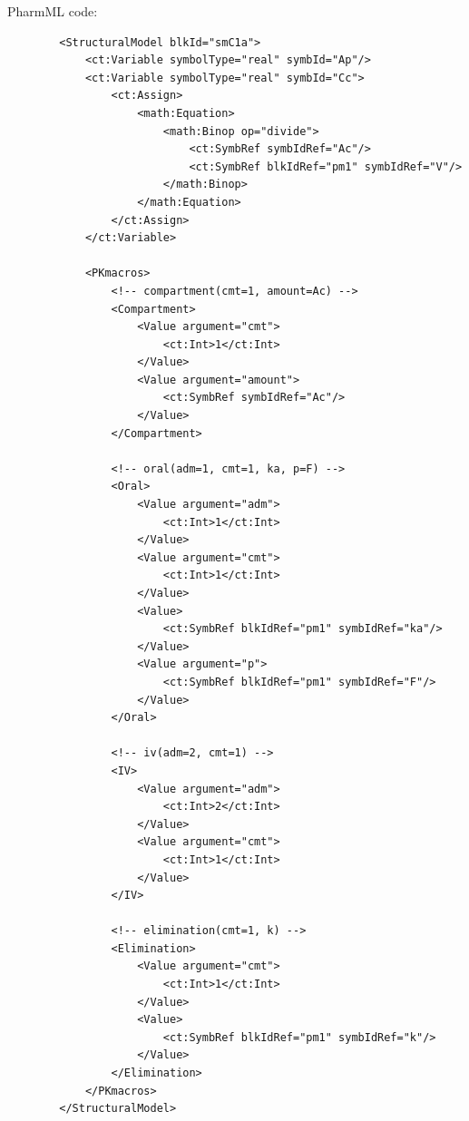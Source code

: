 PharmML code:
\lstset{language=XML}
\begin{lstlisting}
        <StructuralModel blkId="smC1a">
            <ct:Variable symbolType="real" symbId="Ap"/>
            <ct:Variable symbolType="real" symbId="Cc">
                <ct:Assign>
                    <math:Equation>
                        <math:Binop op="divide">
                            <ct:SymbRef symbIdRef="Ac"/>
                            <ct:SymbRef blkIdRef="pm1" symbIdRef="V"/>
                        </math:Binop>
                    </math:Equation>
                </ct:Assign>
            </ct:Variable>
            
            <PKmacros>
                <!-- compartment(cmt=1, amount=Ac) -->
                <Compartment>
                    <Value argument="cmt">
                        <ct:Int>1</ct:Int>
                    </Value>
                    <Value argument="amount">
                        <ct:SymbRef symbIdRef="Ac"/>
                    </Value>
                </Compartment>
                
                <!-- oral(adm=1, cmt=1, ka, p=F) -->
                <Oral>
                    <Value argument="adm">
                        <ct:Int>1</ct:Int>
                    </Value>
                    <Value argument="cmt">
                        <ct:Int>1</ct:Int>
                    </Value>
                    <Value>
                        <ct:SymbRef blkIdRef="pm1" symbIdRef="ka"/>
                    </Value>
                    <Value argument="p">
                        <ct:SymbRef blkIdRef="pm1" symbIdRef="F"/>
                    </Value>
                </Oral>
                
                <!-- iv(adm=2, cmt=1) -->
                <IV>
                    <Value argument="adm">
                        <ct:Int>2</ct:Int>
                    </Value>
                    <Value argument="cmt">
                        <ct:Int>1</ct:Int>
                    </Value>
                </IV>
                
                <!-- elimination(cmt=1, k) -->
                <Elimination>
                    <Value argument="cmt">
                        <ct:Int>1</ct:Int>
                    </Value>
                    <Value>
                        <ct:SymbRef blkIdRef="pm1" symbIdRef="k"/>
                    </Value>
                </Elimination>
            </PKmacros>
        </StructuralModel>
\end{lstlisting}


